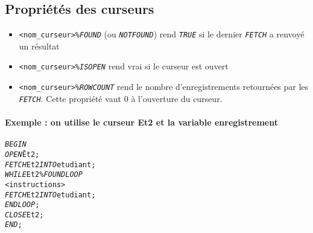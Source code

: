 \documentclass[10pt]{article}
\begin{document}
        \subsection{Propriétés des curseurs}
            \begin{itemize}
                \item \texttt{<nom\_curseur>\%}\emph{\texttt{FOUND}} (ou \emph{\texttt{NOTFOUND}}) rend \emph{\texttt{TRUE}} si le dernier \emph{\texttt{FETCH}} a renvoyé un résultat
                \item \texttt{<nom\_curseur>\%}\emph{\texttt{ISOPEN}} rend vrai si le curseur est ouvert
                \item \texttt{<nom\_curseur>\%}\emph{\texttt{ROWCOUNT}} rend le nombre d'enregistrements retournées par les \emph{\texttt{FETCH}}. Cette propriété vaut 0 à l'ouverture du curseur.
            \end{itemize}

            \paragraph{Exemple : on utilise le curseur Et2 et la variable enregistrement}
                \begin{alltt}
                    \begin{tabbing}
                        \emph{BEGIN}\=\\
                            \>\emph{OPEN} \= Et2;\\
                            \>\emph{FETCH}\> Et2 \emph{INTO} etudiant;\\
                            \>\emph{WHILE}\> Et2\%\emph{FOUND LOOP}\\
                                \>\><instructions>\\
                                \>\>\emph{FETCH} Et2 \emph{INTO} etudiant;\\
                            \>\emph{END LOOP};\\
                            \>\emph{CLOSE} Et2;\\
                        \emph{END};
                    \end{tabbing}
                \end{alltt}
\end{document}
